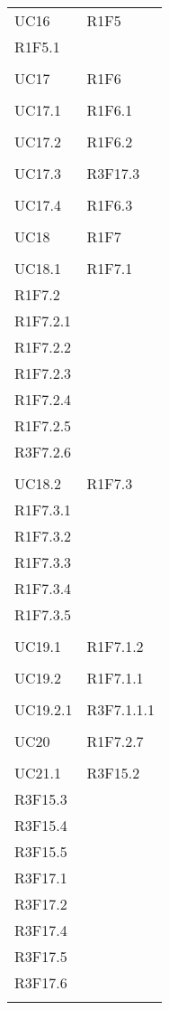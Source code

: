 \begin{longtable}{ >{\centering}p{}
		>{\centering}p{}}
	UC16 & R1F5\\
	R1F5.1 \\\tabularnewline
	
	UC17 & R1F6\\
	\tabularnewline
	
	UC17.1 & R1F6.1\\
	\tabularnewline
	
	UC17.2 & R1F6.2\\
	\tabularnewline
	
	UC17.3 & R3F17.3\\
	\tabularnewline
	
	UC17.4 & R1F6.3\\
	\tabularnewline
	
	UC18 & R1F7\\
	\tabularnewline
	
	UC18.1 & R1F7.1\\
	R1F7.2 \\R1F7.2.1 \\R1F7.2.2 \\R1F7.2.3 \\R1F7.2.4 \\R1F7.2.5 \\R3F7.2.6 \\\tabularnewline
	
	UC18.2 & R1F7.3\\
	R1F7.3.1 \\R1F7.3.2 \\R1F7.3.3 \\R1F7.3.4 \\R1F7.3.5 \\\tabularnewline
	
	UC19.1 & R1F7.1.2\\
	\tabularnewline
	
	UC19.2 & R1F7.1.1\\
	\tabularnewline
	
	UC19.2.1 & R3F7.1.1.1\\
	\tabularnewline
	
	UC20 & R1F7.2.7\\
	\tabularnewline
	
	UC21.1 & R3F15.2\\
	R3F15.3 \\R3F15.4 \\R3F15.5 \\R3F17.1 \\R3F17.2 \\R3F17.4 \\R3F17.5 \\R3F17.6 \\\tabularnewline
	

\end{longtable}
